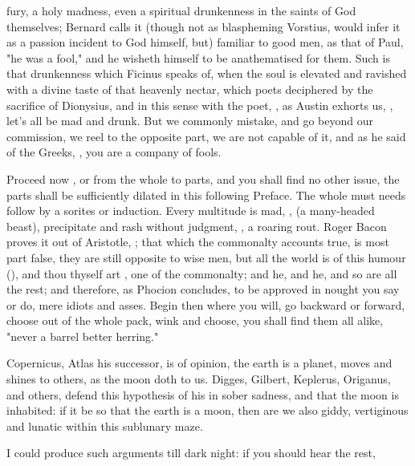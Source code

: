 fury, a holy madness, even a spiritual drunkenness in the saints of God
themselves;  Bernard calls it (though not as blaspheming
Vorstius, would infer it as a passion incident to God
himself, but) familiar to good men, as that of Paul,  "he was a
fool," \etc{} and  he wisheth himself to be
anathematised for them. Such is that drunkenness which Ficinus speaks of, when
the soul is elevated and ravished with a divine taste of that heavenly nectar,
which poets deciphered by the sacrifice of Dionysius, and in this sense with
the poet, , as Austin exhorts us, , let's all be mad and drunk.
But we commonly mistake, and go beyond our commission, we reel to the opposite
part, we are not capable of it, and as
he said of the Greeks, , \etc{} you are a company of fools.

Proceed now , or from the whole to parts, and you shall
find no other issue, the parts shall be sufficiently dilated in this following
Preface. The whole must needs follow by a sorites or induction. Every multitude
is mad, , (a many-headed
beast), precipitate and rash without judgment, , a roaring
rout. Roger Bacon proves it out of Aristotle, ;
that which the commonalty accounts true, is most part false, they are still
opposite to wise men, but all the world is of this humour (), and
thou thyself art , one of the commonalty; and he, and he, and so
are all the rest; and therefore, as Phocion concludes, to be approved in nought
you say or do, mere idiots and asses. Begin then where you will, go backward or
forward, choose out of the whole pack, wink and choose, you shall find them all
alike, "never a barrel better herring."

Copernicus, Atlas his successor, is of opinion, the earth is a planet, moves
and shines to others, as the moon doth to us. Digges, Gilbert, Keplerus,
Origanus, and others, defend this hypothesis of his in sober sadness, and that
the moon is inhabited: if it be so that the earth is a moon, then are we also
giddy, vertiginous and lunatic within this sublunary maze.

I could produce such arguments till dark night: if you should hear the rest,

